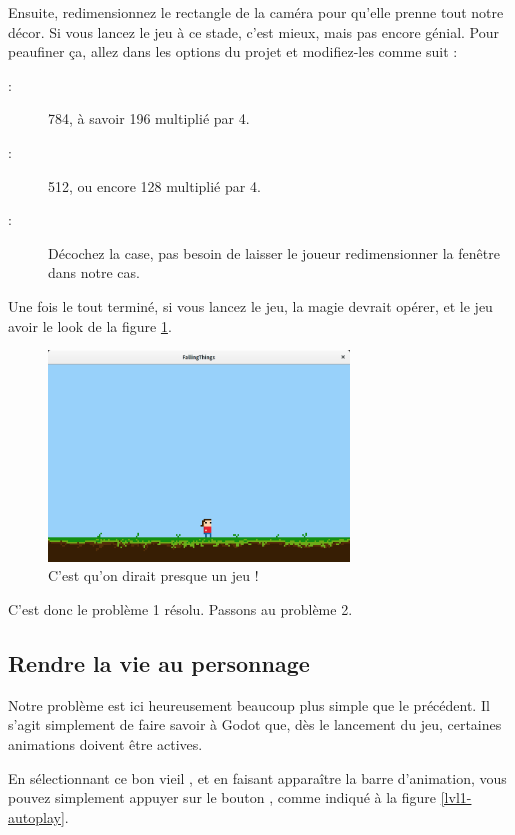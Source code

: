 Ensuite, redimensionnez le rectangle de la caméra pour qu'elle prenne tout notre décor. Si vous lancez le jeu à ce stade, c'est mieux, mais pas encore génial. Pour peaufiner ça, allez dans les options du projet et modifiez-les comme suit :

\begin{description}
\item[ :] 784, à savoir 196 multiplié par 4.
\item[ :] 512, ou encore 128 multiplié par 4.
\item[ :] Décochez la case, pas besoin de laisser le joueur redimensionner la fenêtre dans notre cas.
\end{description}

Une fois le tout terminé, si vous lancez le jeu, la magie devrait opérer, et le jeu avoir le look de la figure \ref{lvl1-gamerun}.

\begin{figure}
  \begin{center}
    \includegraphics[width=8cm]{img/lvl1-gamerun.png}
  \end{center}
  \caption{\label{lvl1-gamerun} C'est qu'on dirait presque un jeu !}
\end{figure}

C'est donc le problème 1 résolu. Passons au problème 2.

\subsection{Rendre la vie au personnage}

Notre problème est ici heureusement beaucoup plus simple que le précédent. Il s'agit simplement de faire savoir à Godot que, dès le lancement du jeu, certaines animations doivent être actives.

En sélectionnant ce bon vieil , et en faisant apparaître la barre d'animation, vous pouvez simplement appuyer sur le bouton , comme indiqué à la figure \ref{lvl1-autoplay}.


